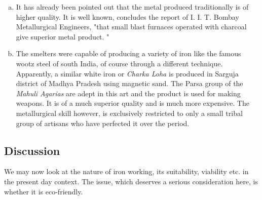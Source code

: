 \begin{enumerate}[a)]
\item It has already been pointed out that the metal produced traditionally is of higher quality. It is well known, concludes the report of I. I. T. Bombay Metallurgical Engineers, "that small blast furnaces operated with charcoal give superior metal product. "
\item The smelters were capable of producing a variety of iron like the famous wootz steel of south India, of course through a different technique. Apparently, a similar white iron or {\it Charka Loha} is produced in Sarguja district of Madhya Pradesh using magnetic sand. The Parsa group of the {\it Mahuli Agarias} are adept in this art and the product is used for making weapons. It is of a much superior quality and is much more expensive. The metallurgical skill however, is exclusively restricted to only a small tribal group of artisans who have perfected it over the period.
\end{enumerate}

\vspace{-.5cm}

\subsection*{Discussion}\label{chapter7-subsection-7.1c}

\vspace{-.2cm}

We may now look at the nature of iron working, its suitability, viability etc. in the present day context. The issue, which deserves a serious consideration here, is whether it is eco-friendly.

